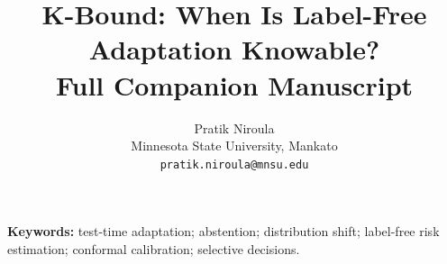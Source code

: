 \documentclass[11pt]{article}
\title{\textbf{K-Bound: When Is Label-Free Adaptation Knowable?}\\[8pt]
\normalsize Full Companion Manuscript}
\author{Pratik Niroula\\
\small Minnesota State University, Mankato\\
\small \texttt{pratik.niroula@mnsu.edu}}
\date{}
\theoremstyle{plain}
\theoremstyle{definition}
\theoremstyle{remark}
\begin{document}
\maketitle

\begin{abstract}

\end{abstract}

\noindent\textbf{Keywords:} test-time adaptation; abstention; distribution shift;
label-free risk estimation; conformal calibration; selective decisions.

\tableofcontents
\clearpage



{\small}

\clearpage


\clearpage

\end{document}
